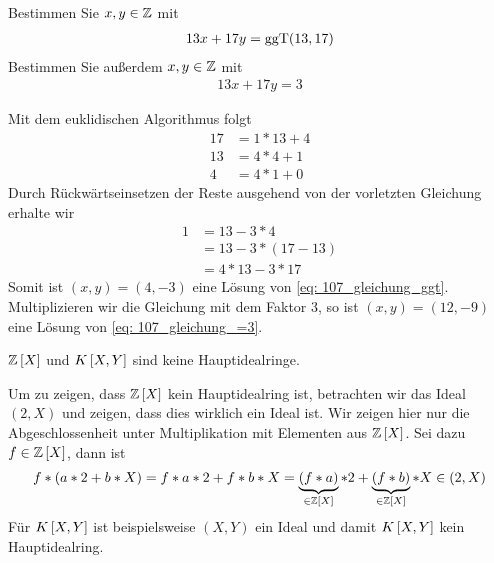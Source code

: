 \begin{exercisePage}
    \pagebreak
    
	\begin{exercise}[Vorbereitung]
		Bestimmen Sie $x,y \in \mathbb{Z}$ mit
		\begin{align} \label{eq: 107_gleichung_ggt}
		13x + 17y = \operatorname{ggT}(13,17) 
		\end{align}
		Bestimmen Sie außerdem $x,y \in \mathbb{Z}$ mit 
		\begin{align} \label{eq: 107_gleichung_=3}
		13x + 17y = 3 
		\end{align}
	\end{exercise}
	\begin{solution}
		Mit dem euklidischen Algorithmus folgt
		\begin{align*}
			17 &= 1*13 + 4 \\
			13 &= 4* 4 + 1 \\
			4  &= 4* 1 + 0
		\end{align*}
		Durch Rückwärtseinsetzen der Reste ausgehend von der vorletzten Gleichung erhalte wir
		\begin{align*}
			1 &= 13 - 3*4 \\
			&= 13 - 3*(17-13) \\
			&= 4*13 - 3*17
		\end{align*}
		Somit ist $(x,y) = (4,-3)$ eine Lösung von \cref{eq: 107_gleichung_ggt}. Multiplizieren wir die Gleichung mit dem Faktor $3$, so ist $(x,y) = (12,-9)$ eine Lösung von \cref{eq: 107_gleichung_=3}.
	\end{solution}
    
	\begin{exercise}[Vorbereitung]
		$\mathbb{Z} \left[ X \right]$ und $K \left[ X,Y \right]$ sind keine Hauptidealringe.
	\end{exercise}
	\begin{solution}
		Um zu zeigen, dass $\mathbb{Z} \left[ X \right]$ kein Hauptidealring ist, betrachten wir das Ideal $(2,X)$ und zeigen, dass dies wirklich ein Ideal ist. Wir zeigen hier nur die Abgeschlossenheit unter Multiplikation mit Elementen aus $\mathbb{Z} \left[ X \right]$. Sei dazu $f \in \mathbb{Z} \left[ X \right]$, dann ist 
		\begin{align*}
			f * (a * 2 + b * X) = f*a*2 + f*b*X = \underbrace{(f*a)}_{\in \mathbb{Z} \left[ X \right]} * 2 + \underbrace{(f*b)}_{\in \mathbb{Z} \left[ X \right]} * X \in (2,X)
		\end{align*}
		Für $K \left[ X,Y \right]$ ist beispielsweise $(X,Y)$ ein Ideal und damit $K \left[ X,Y \right]$ kein Hauptidealring.
	\end{solution}


\end{exercisePage}
